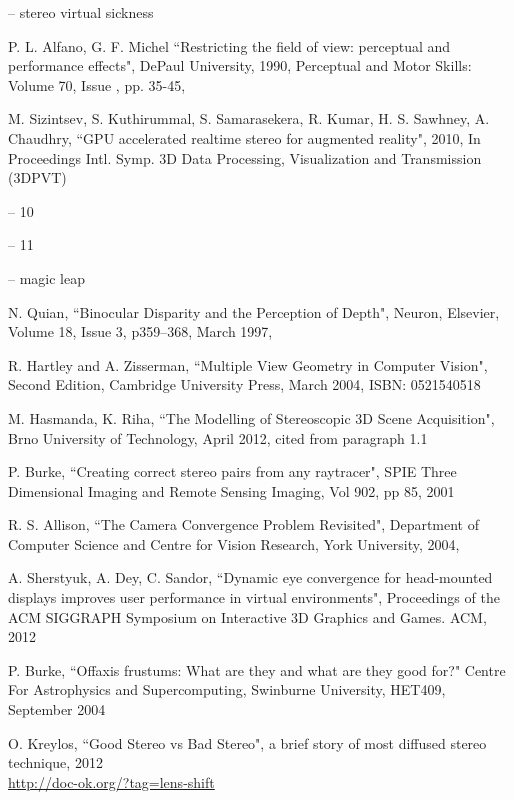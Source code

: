 \begin{thebibliography}{99}
-- stereo virtual sickness

P. L. Alfano, G. F. Michel
``Restricting the field of view: perceptual and performance effects",
DePaul University, 1990, Perceptual and Motor Skills: Volume 70, Issue , pp. 35-45,

M. Sizintsev, S. Kuthirummal, S. Samarasekera, R. Kumar, H. S. Sawhney, A. Chaudhry,
``GPU accelerated realtime stereo for augmented reality", 2010, In Proceedings Intl. Symp. 3D Data Processing, Visualization and Transmission (3DPVT)

-- 10

-- 11

-- magic leap

N. Quian,
``Binocular Disparity and the Perception of Depth",
Neuron, Elsevier, Volume 18, Issue 3, p359–368, March 1997,

R. Hartley and A. Zisserman,
``Multiple View Geometry in Computer Vision", Second Edition, Cambridge University Press, March 2004,
ISBN: 0521540518

M. Hasmanda, K. Riha,
``The Modelling of Stereoscopic 3D Scene Acquisition",
Brno University of Technology, April 2012, cited from paragraph 1.1

P. Burke,
``Creating correct stereo pairs from any raytracer",
SPIE Three Dimensional Imaging and Remote Sensing Imaging, Vol 902, pp 85, 2001

R. S. Allison,
``The Camera Convergence Problem Revisited",
Department of Computer Science and Centre for Vision Research, York
University, 2004,

A. Sherstyuk, A. Dey, C. Sandor,
``Dynamic eye convergence for head-mounted displays improves user performance in virtual environments",
Proceedings of the ACM SIGGRAPH Symposium on Interactive 3D Graphics and Games. ACM, 2012



P. Burke,
``Offaxis frustums: What are they and what are they good for?"
Centre For Astrophysics and Supercomputing, Swinburne University, HET409, September 2004

O. Kreylos,
``Good Stereo vs Bad Stereo", a brief story of most diffused stereo technique, 2012 \\ \href{http://doc-ok.org/?tag=lens-shift}{http://doc-ok.org/?tag=lens-shift}


\end{thebibliography}
